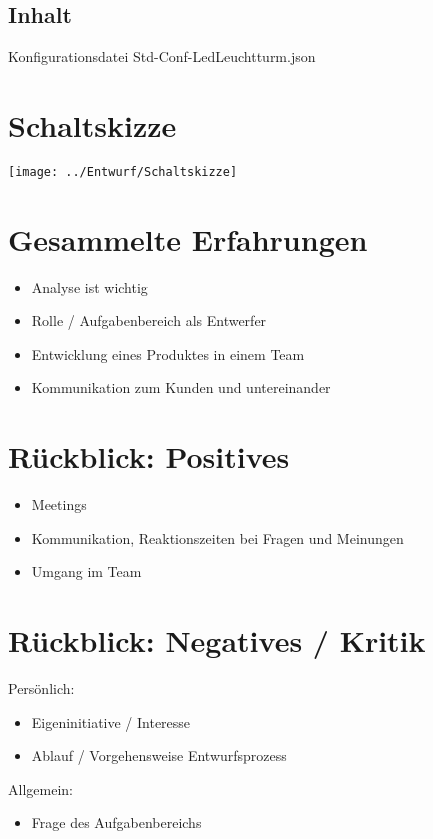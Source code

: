 \documentclass[ignorenonframetext, 11pt, table]{beamer}
\begin{document}
\subsection{Inhalt}
\begin{frame}
	\lstset{ %
		basicstyle=\ttfamily\tiny
	}	
	Konfigurationsdatei Std-Conf-LedLeuchtturm.json	
	
\end{frame}

\section{Schaltskizze}
\begin{frame}
	\begin{center}
		\texttt{[image: ../Entwurf/Schaltskizze]}
	\end{center}
\end{frame}


\section{Gesammelte Erfahrungen}
\begin{frame}
	\begin{itemize}
		\setlength\itemsep{0.2em}
		\item Analyse ist wichtig
		\item Rolle / Aufgabenbereich als Entwerfer
		\item Entwicklung eines Produktes in einem Team
		\item Kommunikation zum Kunden und untereinander
	\end{itemize} 
\end{frame}

\section{Rückblick: Positives}
\begin{frame}
	\begin{itemize}
		\setlength\itemsep{0.2em}
		\item Meetings
		\item Kommunikation, Reaktionszeiten bei Fragen und Meinungen
		\item Umgang im Team
	\end{itemize}  
\end{frame}


\section{Rückblick: Negatives / Kritik}
\begin{frame}
	Persönlich:
	\begin{itemize}
		\setlength\itemsep{0.2em}
		\item Eigeninitiative / Interesse
		\item Ablauf / Vorgehensweise Entwurfsprozess
	\end{itemize}\pause
	Allgemein:
	\begin{itemize}
		\setlength\itemsep{0.2em}
		\item Frage des Aufgabenbereichs  
	\end{itemize}
\end{frame}
\end{document}
